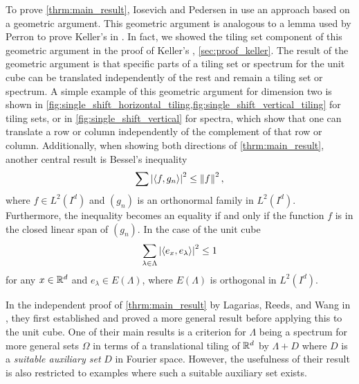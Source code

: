 \documentclass[../thesis.tex]{subfiles}
\begin{document}
To prove \cref{thrm:main_result}, Iosevich and Pedersen in \cite{iosevichSpectralTilingProperties1998} use an approach based on a geometric argument. This geometric argument is analogous to a lemma used by Perron to prove Keller's  in \cite{perronUeberLueckenloseAusfuellung1940}. In fact, we showed the tiling set component of this geometric argument in the proof of Keller's , \cref{sec:proof_keller}. The result of the geometric argument is that specific parts of a tiling set or spectrum for the unit cube can be translated independently of the rest and remain a tiling set or spectrum. A simple example of this geometric argument for dimension two is shown in \cref{fig:single_shift_horizontal_tiling,fig:single_shift_vertical_tiling} for tiling sets, or in \cref{fig:single_shift_vertical} for spectra, which show that one can translate a row or column independently of the complement of that row or column. Additionally, when showing both directions of \cref{thrm:main_result}, another central result is Bessel's inequality
\begin{equation*}%
    \sum\bralMed{\braaMed{f,g_n}}^2 \leq \branMed{f}^2,
\end{equation*}
where $f\in L^2(I^d)$ and $(g_n)$ is an orthonormal family in $L^2(I^d)$. Furthermore, the inequality becomes an equality if and only if the function $f$ is in the closed linear span of $(g_n)$. In the case of the unit cube
\begin{equation*}
    \sum_{\lambda \in \Lambda} \left|\left \langle e_x,e_\lambda \right \rangle\right|^2 \leq 1
\end{equation*}
for any $x\in \mathbb{R}^d$ and $e_\lambda\in E(\Lambda)$, where $E(\Lambda)$ is orthogonal in $L^2(I^d)$. 





In the independent proof of \cref{thrm:main_result} by Lagarias, Reeds, and Wang in \cite{lagariasOrthonormalBasesExponentials2000}, they first established and proved a more general result before applying this to the unit cube. One of their main results is a criterion for $\Lambda$ being a spectrum for more general sets $\Omega$ in terms of a translational tiling of $\mathbb{R}^d$ by $\Lambda+D$ where $D$ is a \emph{suitable auxiliary set} $D$ in Fourier space. However, the usefulness of their result is also restricted to examples where such a suitable auxiliary set exists. 
\end{document}
